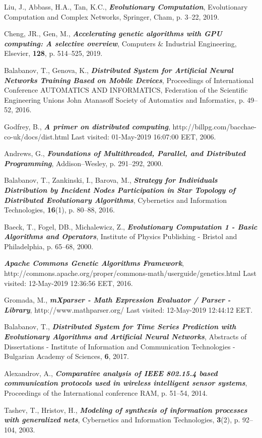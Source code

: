 \documentclass[graybox]{svmult}
\begin{document}
\begin{thebibliography}{99}
 Liu, J., Abbass, H.A., Tan, K.C., \textbf{\textit{Evolutionary Computation}}, Evolutionary Computation and Complex Networks, Springer, Cham, p. 3--22, 2019.

 Cheng, JR., Gen, M., \textbf{\textit{Accelerating genetic algorithms with GPU computing: A selective overview}}, Computers \& Industrial Engineering, Elsevier, \textbf{128}, p. 514--525, 2019.

 Balabanov, T., Genova, K., \textbf{\textit{Distributed System for Artificial Neural Networks Training Based on Mobile Devices}}, Proceedings of International Conference AUTOMATICS AND INFORMATICS, Federation of the Scientific Engineering Unions John Atanasoff Society of Automatics and Informatics, p. 49--52, 2016.

 Godfrey, B., \textbf{\textit{A primer on distributed computing}}, http://billpg.com/bacchae-co-uk/docs/dist.html Last visited: 01-May-2019 16:07:00 EET, 2006.

 Andrews, G., \textbf{\textit{Foundations of Multithreaded, Parallel, and Distributed Programming}}, Addison–Wesley, p. 291--292, 2000.

 Balabanov, T., Zankinski, I., Barova, M., \textbf{\textit{Strategy for Individuals Distribution by Incident Nodes Participation in Star Topology of Distributed Evolutionary Algorithms}}, Cybernetics and Information Technologies, \textbf{16}(1), p. 80--88, 2016.

 Baeck, T., Fogel, DB., Michalewicz, Z., \textbf{\textit{Evolutionary Computation 1 - Basic Algorithms and Operators}}, Institute of Physics Publishing - Bristol and Philadelphia, p. 65--68, 2000.

 \textbf{\textit{Apache Commons Genetic Algorithms Framework}}, http://commons.apache.org/proper/commons-math/userguide/genetics.html Last visited: 12-May-2019 12:36:56 EET, 2016.

 Gromada, M., \textbf{\textit{mXparser - Math Expression Evaluator / Parser - Library}}, http://www.mathparser.org/ Last visited: 12-May-2019 12:44:12 EET.

 Balabanov, T., \textbf{\textit{Distributed System for Time Series Prediction with Evolutionary Algorithms and Artificial Neural Networks}}, Abstracts of Dissertations - Institute of Information and Communication Technologies - Bulgarian Academy of Sciences, \textbf{6}, 2017.

 Alexandrov, A., \textbf{\textit{Comparative analysis of IEEE 802.15.4 based communication protocols used in wireless intelligent sensor systems}}, Proceedings of the International conference RAM, p. 51--54, 2014.

 Tashev, T., Hristov, H., \textbf{\textit{Modeling of synthesis of information processes with generalized nets}}, Cybernetics and Information Technologies, \textbf{3}(2), p. 92--104, 2003.

\end{thebibliography}
\end{document}
